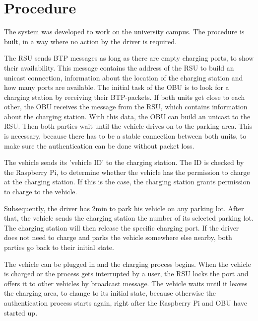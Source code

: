 \clearpage
\newpage

\section{Procedure}

The system was developed to work on the university campus. The procedure is built, in a way where no action by the driver is required.

The RSU sends BTP messages as long as there are empty charging ports, to show their availability. This message contains the address of the RSU to build an unicast connection, information about the location of the charging station and how many ports are available. The initial task of the OBU is to look for a charging station by receiving their BTP-packets. If both units get close to each other, the OBU receives the message from the RSU, which contains information about the charging station. With this data, the OBU can build an unicast to the RSU. Then both parties wait until the vehicle drives on to the parking area. This is necessary, because there has to be a stable connection between both units, to make sure the authentication can be done without packet loss.

The vehicle sends its 'vehicle ID' to the charging station. The ID is checked by the Raspberry Pi, to determine whether the vehicle has the permission to charge at the charging station. If this is the case, the charging station grants permission to charge to the vehicle.

Subsequently, the driver has 2\;min to park his vehicle on any parking lot. After that, the vehicle sends the charging station the number of its selected parking lot. The charging station will then release the specific charging port. If the driver does not need to charge and parks the vehicle somewhere else nearby, both parties go back to their initial state.

The vehicle can be plugged in and the charging process begins. When the vehicle is charged or the process gets interrupted by a user, the RSU locks the port and offers it to other vehicles by broadcast message. The vehicle waits until it leaves the charging area, to change to its initial state, because otherwise the authentication process starts again, right after the Raspberry Pi and OBU have started up.

